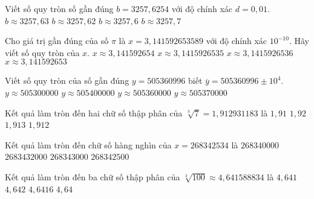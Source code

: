 \begin{ex}%
	Viết số quy tròn số gần đúng $b=3257,6254$ với độ chính xác $d=0,01$.
	\choice
	{$b\approx 3257,63$}
	{$b\approx 3257,62$}
	{\True $b\approx 3257,6$}
	{$b\approx 3257,7$}
\end{ex}

\begin{ex}%
	Cho giá trị gần đúng của số $\pi$ là $x=3,141592653589$ với độ chính xác $10^{-10}$. Hãy viết số quy tròn của $x$.
	\choice
	{\True $x\approx 3,141592654$}
	{$x\approx 3,1415926535$}
	{$x\approx 3,1415926536$}
	{$x\approx 3,141592653$}
\end{ex}

\begin{ex}%
	Viết số quy tròn của số gần đúng $y=505360996$ biết $\overline{y}=505360996\pm 10^4$.
	\choice
	{$y\approx 505300000$}
	{\True $y\approx 505400000$}
	{$y\approx 505360000$}
	{$y\approx 505370000$}
\end{ex}

\begin{ex}%
	Kết quả làm tròn đến hai chữ số thập phân của $ \sqrt[3]{7}=1,912931183 $ là
	\choice
	{\True $ 1,91 $}
	{ $ 1,92 $}
	{ $ 1,913 $}
	{ $ 1,912 $}
\end{ex}

\begin{ex}%
	Kết quả làm tròn đến chữ số hàng nghìn của $ x=268342534 $ là
	\choice
	{ $268340000 $}
	{ $2683432000  $}
	{\True $ 268343000 $}
	{ $ 268342500 $}
\end{ex}

\begin{ex}%
	Kết quả làm tròn đến ba chữ số thập phân của $ \sqrt[3]{100} \approx 4,641588834 $ là
	\choice
	{ $ 4,641 $}
	{\True $ 4,642 $}
	{ $ 4,6416 $}
	{ $ 4,64 $}
\end{ex}

